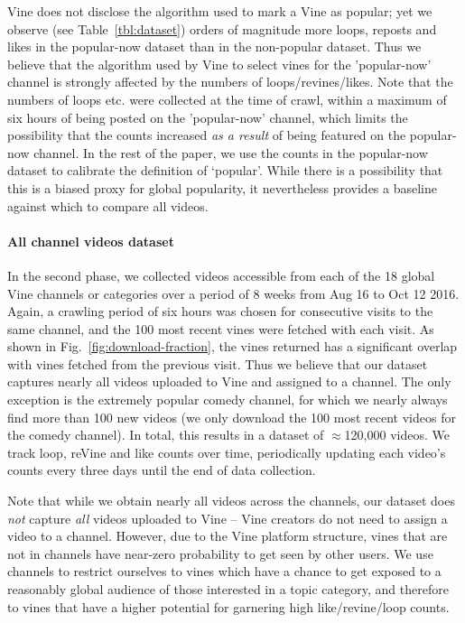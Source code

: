 Vine does not disclose the algorithm used to mark a Vine as popular; yet we observe (see Table~\ref{tbl:dataset}) orders of magnitude more loops, reposts and likes in the popular-now dataset than in the non-popular dataset. Thus we believe that the algorithm used by Vine to select vines for the 'popular-now' channel is strongly affected by the numbers of loops/revines/likes. Note that the numbers of loops etc. were collected at the time of crawl, within a maximum of six hours of being posted on the 'popular-now' channel, which limits the possibility that the counts increased \emph{as a result} of being featured on the popular-now channel. In the rest of the paper, we use the counts in the popular-now dataset to calibrate the definition of `popular'. While there is a possibility that this is a biased proxy for global popularity, it nevertheless provides a baseline against which to compare all videos.

\paragraph{All channel videos dataset} In the second phase, we collected 
videos accessible from each of the 18 global Vine channels or categories%
 over a period of {8 weeks} from {Aug 16 to Oct 12  2016}. Again, a crawling period of six hours was chosen for consecutive visits to the same channel, and the 100 most recent vines were fetched with each visit. As shown in Fig.~\ref{fig:download-fraction}, the  vines returned has a significant overlap with vines fetched from the previous visit. Thus we believe that our dataset captures nearly all videos uploaded to Vine and assigned to a channel. The only exception is the extremely popular comedy channel, for which we nearly always find more than 100 new videos (we only download the 100 most recent videos for the comedy channel). In total, this results in a dataset of $\approx$120,000 videos. We track  loop, reVine and like counts  over time, periodically updating each video's counts every three days until the end of  data collection.
  
Note that while we obtain nearly all videos across the channels, our dataset does \emph{not} capture  \emph{all} videos uploaded to Vine -- Vine creators do not need to assign a video to a channel. However, due to the Vine platform structure,  vines that are not in channels have near-zero probability to get seen by other users. %
We use channels to restrict ourselves to vines which have a chance to get exposed to a reasonably global audience of those interested in a topic category, and therefore to vines that have a higher potential for garnering high like/revine/loop counts. 

